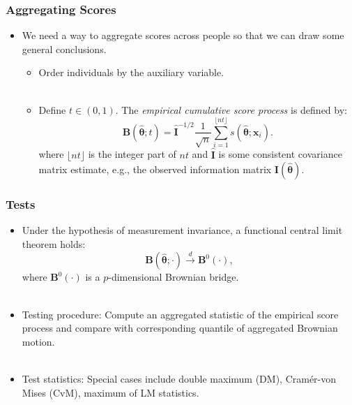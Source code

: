 \documentclass{beamer}
\begin{document}
\begin{frame}[fragile]
  \frametitle{Aggregating Scores}
  \begin{itemize}
    \item We need a way to aggregate scores across people so that we
      can draw some general conclusions.
      \begin{itemize}
        \item Order individuals by the auxiliary variable.\\ \ \\
        \item Define $t \in (0, 1)$.
          The {\em empirical cumulative score process} is defined by:\\
  \begin{equation*}
    \bm{B}(\hat{\bm{\theta}}; t) = 
      {\bm{\widehat I}}^{-1/2} \frac{1}{\sqrt{n}}
    \displaystyle\sum_{i=1}^{\lfloor nt 
      \rfloor} s(\hat{\bm{\theta}} ; \bm{x}_i).
    \end{equation*}
  where $\lfloor nt \rfloor$ is the integer part of $nt$
  and $\bm{\widehat I}$ is some consistent covariance matrix estimate, e.g.,
  the observed information matrix ${\bm{I}}(\widehat{{\bm{\theta}}})$.

      \end{itemize}
  \end{itemize}
\end{frame}


\begin{frame}[fragile]
  \frametitle{Tests}
  \begin{itemize}
    \item Under the hypothesis of
      measurement invariance, a functional central limit
      theorem holds:
  \begin{equation*}
  {\bm{B}}(\widehat{{\bm{\theta}}}; \cdot) \overset{d}{\rightarrow} {\bm B}^{0}(\cdot),
  \end{equation*}
 where ${\bm B}^{0}(\cdot)$ is a $p$-dimensional Brownian bridge.\\ \ \\

   \item Testing procedure: Compute an aggregated statistic of the empirical
     score process and compare with corresponding quantile of aggregated
     Brownian motion.\\ \ \\

    \item Test statistics: Special cases include double maximum (DM), Cram\'er-von Mises
      (CvM), maximum of LM statistics.
  \end{itemize}
\end{frame}
\end{document}

